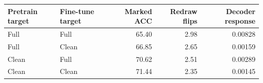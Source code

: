 \begin{tabular}{llrrr}
\toprule
Pretrain target & Fine-tune target & Marked ACC & Redraw flips & Decoder response\\
\midrule
Full & Full & 65.40 & 2.98 & 0.00828\\
Full & Clean & 66.85 & 2.65 & 0.00159\\
Clean & Full & 70.62 & 2.51 & 0.00289\\
Clean & Clean & 71.44 & 2.35 & 0.00145\\
\bottomrule
\end{tabular}
